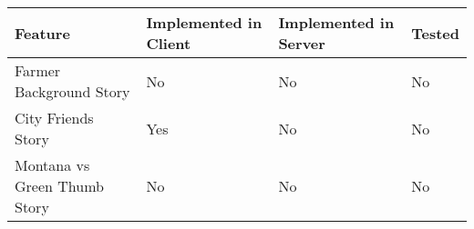 \begin{tabular}{|l|l|l|l|}
\hline
Feature & Implemented in Client & Implemented in Server & Tested \\ 
\hline
\cellcolor{White}Farmer Background Story &\cellcolor{FeatureNo}No &\cellcolor{FeatureNo}No &\cellcolor{FeatureNo}No \\\hline
\cellcolor{FeatureOdd}City Friends Story &\cellcolor{FeatureYes}Yes &\cellcolor{FeatureNo}No &\cellcolor{FeatureNo}No \\\hline
\cellcolor{White}Montana vs Green Thumb Story &\cellcolor{FeatureNo}No &\cellcolor{FeatureNo}No &\cellcolor{FeatureNo}No \\\hline
\end{tabular}
